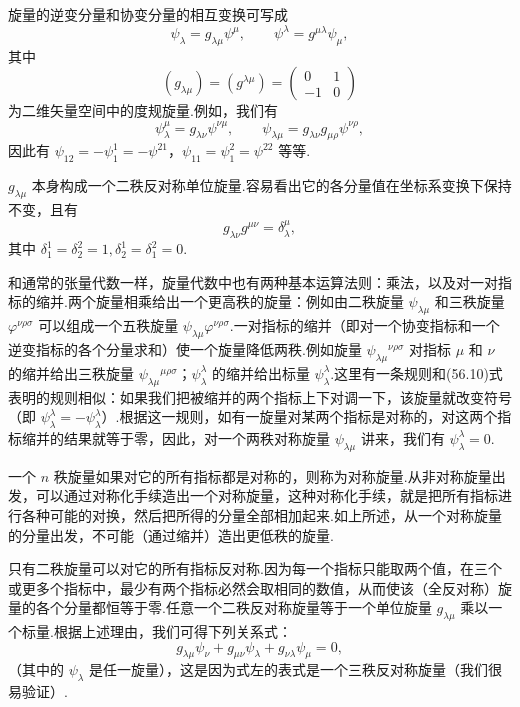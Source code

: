 旋量的逆变分量和协变分量的相互变换可写成
\begin{equation}
  \psi_{\lambda}=g_{\lambda\mu}\psi^{\mu},\qquad
  \psi^{\lambda}=g^{\mu\lambda}\psi_{\mu},
\end{equation}
其中
\begin{equation}
  (g_{\lambda\mu})=(g^{\lambda\mu})=
  \left(\begin{array}{rr}0&1\\-1&0\end{array}\right)
\end{equation}
为二维矢量空间中的度规旋量.例如，我们有
\begin{equation*}
  \psi^{\mu}_{\lambda}=g_{\lambda\nu}\psi^{\nu\mu},\qquad
  \psi_{\lambda\mu}=g_{\lambda\nu}g_{\mu\rho}\psi^{\nu\rho},
\end{equation*}
因此有 $\psi_{12}=-\psi^1_1=-\psi^{21}$，$\psi_{11}=\psi^2_1=\psi^{22}$ 等等.

$g_{\lambda\mu}$ 本身构成一个二秩反对称单位旋量.容易看出它的各分量值在坐标系变换下保持不变，且有
\begin{equation}
  g_{\lambda\nu}g^{\mu\nu}=\delta^{\mu}_{\lambda},
\end{equation}
其中 $\delta^1_1=\delta^2_2=1,\delta^1_2=\delta^2_1=0$.

和通常的张量代数一样，旋量代数中也有两种基本运算法则：乘法，以及对一对指标的缩并.两个旋量相乘给出一个更高秩的旋量：例如由二秩旋量 $\psi_{\lambda\mu}$ 和三秩旋量 $\varphi^{\nu\rho\sigma}$ 可以组成一个五秩旋量 $\psi_{\lambda\mu}\varphi^{\nu\rho\sigma}$.一对指标的缩并（即对一个协变指标和一个逆变指标的各个分量求和）使一个旋量降低两秩.例如旋量 $\psi_{\lambda\mu}{}^{\nu\rho\sigma}$ 对指标 $\mu$ 和 $\nu$ 的缩并给出三秩旋量 $\psi_{\lambda\mu}{}^{\mu\rho\sigma}$；$\psi^{\lambda}_{\lambda}$ 的缩并给出标量 $\psi^{\lambda}_{\lambda}$.这里有一条规则和(56.10)式表明的规则相似：如果我们把被缩并的两个指标上下对调一下，该旋量就改变符号（即 $\psi^{\lambda}_{\lambda}=-\psi^{\lambda}_{\lambda}$）.根据这一规则，如有一旋量对某两个指标是对称的，对这两个指标缩并的结果就等于零，因此，对一个两秩对称旋量 $\psi_{\lambda\mu}$ 讲来，我们有 $\psi^{\lambda}_{\lambda}=0$.

一个 $n$ 秩旋量如果对它的所有指标都是对称的，则称为对称旋量.从非对称旋量出发，可以通过对称化手续造出一个对称旋量，这种对称化手续，就是把所有指标进行各种可能的对换，然后把所得的分量全部相加起来.如上所述，从一个对称旋量的分量出发，不可能（通过缩并）造出更低秩的旋量.

只有二秩旋量可以对它的所有指标反对称.因为每一个指标只能取两个值，在三个或更多个指标中，最少有两个指标必然会取相同的数值，从而使该（全反对称）旋量的各个分量都恒等于零.任意一个二秩反对称旋量等于一个单位旋量 $g_{\lambda\mu}$ 乘以一个标量.根据上述理由，我们可得下列关系式：
\begin{equation}
  g_{\lambda\mu}\psi_{\nu}+g_{\mu\nu}\psi_{\lambda}+g_{\nu\lambda}\psi_{\mu}=0,
\end{equation}
（其中的 $\psi_{\lambda}$ 是任一旋量），这是因为式左的表式是一个三秩反对称旋量（我们很易验证）.

